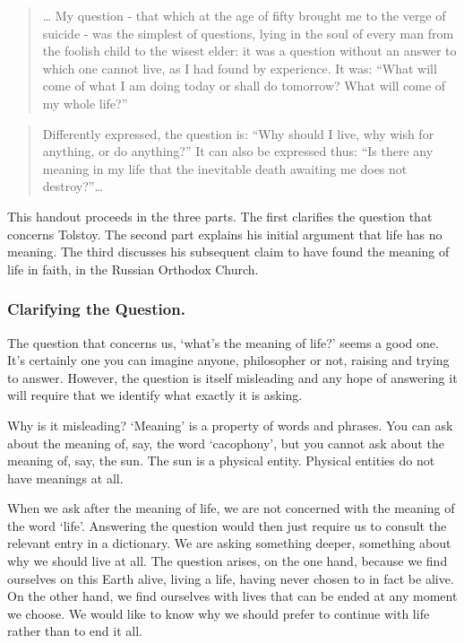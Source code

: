 \documentclass[]{article}
\begin{document}
\begin{quote}
\ldots{} My question - that which at the age of fifty brought me to the
verge of suicide - was the simplest of questions, lying in the soul of
every man from the foolish child to the wisest elder: it was a question
without an answer to which one cannot live, as I had found by
experience. It was: ``What will come of what I am doing today or shall
do tomorrow? What will come of my whole life?''
\end{quote}

\begin{quote}
Differently expressed, the question is: ``Why should I live, why wish
for anything, or do anything?'' It can also be expressed thus: ``Is
there any meaning in my life that the inevitable death awaiting me does
not destroy?''\ldots{}
\end{quote}

This handout proceeds in the three parts. The first clarifies the
question that concerns Tolstoy. The second part explains his initial
argument that life has no meaning. The third discusses his subsequent
claim to have found the meaning of life in faith, in the Russian
Orthodox Church.

\subsubsection{Clarifying the Question.}\label{clarifying-the-question.}

The question that concerns us, `what's the meaning of life?' seems a
good one. It's certainly one you can imagine anyone, philosopher or not,
raising and trying to answer. However, the question is itself misleading
and any hope of answering it will require that we identify what exactly
it is asking.

Why is it misleading? `Meaning' is a property of words and phrases. You
can ask about the meaning of, say, the word `cacophony', but you cannot
ask about the meaning of, say, the sun. The sun is a physical entity.
Physical entities do not have meanings at all.

When we ask after the meaning of life, we are not concerned with the
meaning of the word `life'. Answering the question would then just
require us to consult the relevant entry in a dictionary. We are asking
something deeper, something about why we should live at all. The
question arises, on the one hand, because we find ourselves on this
Earth alive, living a life, having never chosen to in fact be alive. On
the other hand, we find ourselves with lives that can be ended at any
moment we choose. We would like to know why we should prefer to continue
with life rather than to end it all.
\end{document}

